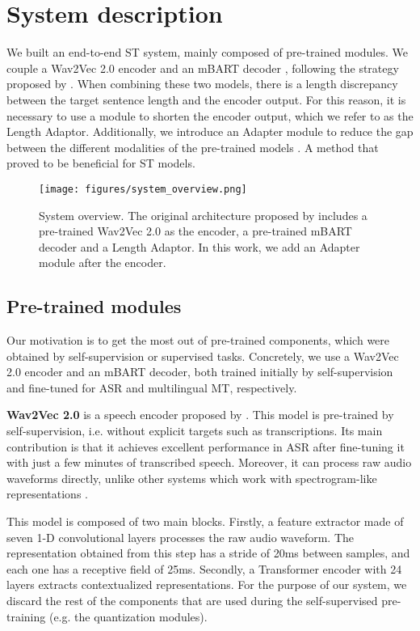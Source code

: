\documentclass[11pt,a4paper]{article}
\begin{document}
\section{System description}
    We built an end-to-end ST system, mainly composed of pre-trained modules. We couple a Wav2Vec 2.0 encoder \cite{wav2vec2.0} and an mBART decoder \cite{mBART}, following the strategy proposed by \citet{lna}. When combining these two models, there is a length discrepancy between the target sentence length and the encoder output. For this reason, it is necessary to use a module to shorten the encoder output, which we refer to as the Length Adaptor.
    Additionally, we introduce an Adapter module to reduce the gap between the different modalities of the pre-trained models \cite{adapter}. A method that \citet{adapter-st} proved to be beneficial for ST models.
    
    \begin{figure}[t]
      \centering
      \texttt{[image: figures/system\_overview.png]}
      \caption{System overview. The original architecture proposed by \citet{lna} includes a pre-trained Wav2Vec 2.0 as the encoder, a pre-trained mBART decoder and a Length Adaptor. In this work, we add an Adapter module after the encoder.}
      \label{fig:system_overview}
    \end{figure}

    \subsection{Pre-trained modules} \label{sec:pre-trained}
        Our motivation is to get the most out of pre-trained components, which were obtained by self-supervision or supervised tasks. Concretely, we use a Wav2Vec 2.0 encoder and an mBART decoder, both trained initially by self-supervision and fine-tuned for ASR and multilingual MT, respectively.
        
        \textbf{Wav2Vec 2.0} is a speech encoder proposed by \citet{wav2vec2.0}. This model is pre-trained by self-supervision, i.e. without explicit targets such as transcriptions. Its main contribution is that it achieves excellent performance in ASR after fine-tuning it with just a few minutes of transcribed speech. Moreover, it can process raw audio waveforms directly, unlike other systems which work with spectrogram-like representations \cite{s-transformer}.
        
        This model is composed of two main blocks. Firstly, a feature extractor made of seven 1-D convolutional layers processes the raw audio waveform. The representation obtained from this step has a stride of 20ms between samples, and each one has a receptive field of 25ms. Secondly, a Transformer \cite{transformer} encoder with 24 layers extracts contextualized representations. For the purpose of our system, we discard the rest of the components that are used during the self-supervised pre-training (e.g. the quantization modules).
        
\end{document}
